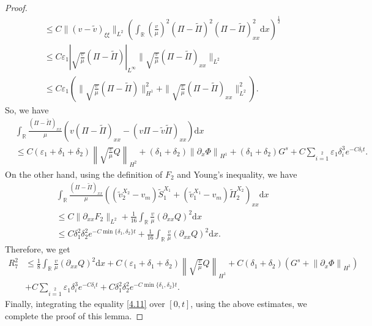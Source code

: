 \documentclass[10pt,reqno]{amsart}
\numberwithin{equation}{section}
\newcommand{\dif}{\mathrm{d}}
\begin{document}
\begin{proof}
\begin{align*}
&\leq C
\|(v-\widetilde{v})_{\xi\xi}\|_{L^2}
\left(\int_\mathbb{R}\left(\frac{v}{\mu}\right)^2(\Pi-\widetilde{\Pi})^2(\Pi-\widetilde{\Pi})_{xx}^2\dif x\right)^{\frac{1}{2}}\\
&\leq C\varepsilon_1|\sqrt{\frac{v}{\mu}}(\Pi-\widetilde{\Pi})|_{L^{\infty}}
\|\sqrt{\frac{v}{\mu}}(\Pi-\widetilde{\Pi})_{xx}\|_{L^2}\\
&\leq C\varepsilon_1\left(\|\sqrt{\frac{v}{\mu}}(\Pi-\widetilde{\Pi})\|_{H^1}^2+
\|\sqrt{\frac{v}{\mu}}(\Pi-\widetilde{\Pi})_{xx}\|_{L^2}^2\right).
\end{align*}
So, we have
\begin{align*}
 &\int_\mathbb{R}\frac{(\Pi-\widetilde{\Pi})_{xx}}{\mu}
 \left(v(\Pi-\widetilde{\Pi})_{xx}-(v\Pi-\widetilde{v}\widetilde{\Pi})_{xx}\right)\dif x\\
 &\le C(\varepsilon_1+\delta_1+\delta_2)\left\|\sqrt{\frac{v}{\mu}}Q\right\|_{H^2}
 +(\delta_1+\delta_2)\left\|\partial_x\Phi\right\|_{H^1}+(\delta_1+\delta_2)G^s+C\sum\limits_{i=1}\limits^2\varepsilon_1 \delta_i^3e^{-C\delta_i t}.
\end{align*}
On the other hand, using the definition of $F_2$ and Young's inequality, we have
\begin{align*}
 &\int_\mathbb{R}\frac{(\Pi-\widetilde{\Pi})_{xx}}{\mu}
 \left(\left(\widetilde{v}^{X_2}_2-v_m\right)\widetilde{S}_1^{X_1}
+\left(\widetilde{v}^{X_1}_1-v_m\right)\widetilde{\Pi}_2^{X_2}\right)_{xx}\dif x\\
&\le C\|\partial_{xx}F_2\|_{L^2}
+\frac{1}{16}\int_\mathbb{R}\frac{v}{\mu}(\partial_{xx}Q)^2\dif x\\
&\le C\delta_1^2\delta_2^2e^{-C\min\{\delta_1,\delta_2\}t}
+\frac{1}{16}\int_\mathbb{R}\frac{v}{\mu}(\partial_{xx}Q)^2\dif x.
\end{align*}
Therefore, we get
\begin{align*}
R_7^2&\le \frac{1}{8}\int_\mathbb{R}\frac{v}{\mu}(\partial_{xx}Q)^2\dif x
 +C(\varepsilon_1+\delta_1+\delta_2)\left\|\sqrt{\frac{v}{\mu}}Q\right\|_{H^1}
  +C(\delta_1+\delta_2)\left(G^s+\left\|\partial_x\Phi\right\|_{H^1}\right)\\
  &+C\sum\limits_{i=1}\limits^2\varepsilon_1 \delta_i^3e^{-C\delta_i t}
 +C\delta_1^2\delta_2^2e^{-C\min\{\delta_1,\delta_2\}t}.
\end{align*}
Finally, integrating the equality \eqref{4.11} over $[0,t]$, using the above estimates, we complete the proof of this lemma.
\end{proof}
\end{document}
